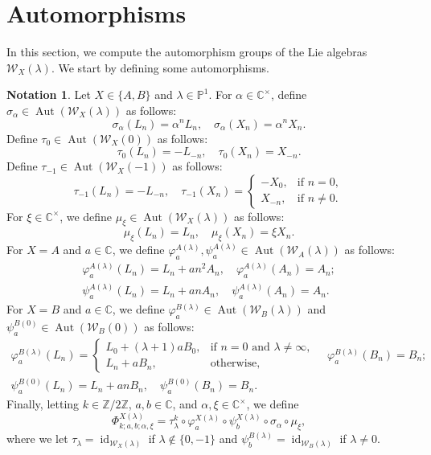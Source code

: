 \documentclass[11pt, svgnames]{amsart}
\newcommand{\ZZ}{\mathbb{Z}}
\newcommand{\CC}{\mathbb{C}}
\newcommand{\PP}{\mathbb{P}}
\newcommand{\W}{\mathcal{W}}
\DeclareMathOperator{\id}{id}
\DeclareMathOperator{\Aut}{Aut}
\theoremstyle{definition}
\newtheorem{Notation}[proposition]{Notation}
\begin{document}
\section{Automorphisms}\label{sec:automorphisms}

In this section, we compute the automorphism groups of the Lie algebras $\W_X(\lambda)$. We start by defining some automorphisms.

\begin{Notation}\label{ntt:automorphisms}
    Let $X \in \{A,B\}$ and $\lambda \in \PP^1$. For $\alpha \in \CC^\times$, define $\sigma_\alpha \in \Aut(\W_X(\lambda))$ as follows:
    $$\sigma_\alpha(L_n) = \alpha^n L_n, \quad \sigma_\alpha(X_n) = \alpha^n X_n.$$
    Define $\tau_0 \in \Aut(\W_X(0))$ as follows:
    $$\tau_0(L_n) = -L_{-n}, \quad \tau_0(X_n) = X_{-n}.$$
    Define $\tau_{-1} \in \Aut(\W_X(-1))$ as follows:
    $$\tau_{-1}(L_n) = -L_{-n}, \quad \tau_{-1}(X_n) = \begin{cases}
        -X_0, &\text{if } n = 0, \\
        X_{-n}, &\text{if } n \neq 0.
    \end{cases}$$
    For $\xi \in \CC^\times$, we define $\mu_\xi \in \Aut(\W_X(\lambda))$ as follows:
    $$\mu_\xi(L_n) = L_n, \quad \mu_\xi(X_n) = \xi X_n.$$
    For $X = A$ and $a \in \CC$, we define $\varphi^{A(\lambda)}_a, \psi^{A(\lambda)}_a \in \Aut(\W_A(\lambda))$ as follows:
    $$\begin{gathered}
        \varphi^{A(\lambda)}_a(L_n) = L_n + an^2 A_n, \quad \varphi^{A(\lambda)}_a(A_n) = A_n; \\
        \psi^{A(\lambda)}_a(L_n) = L_n + an A_n, \quad \psi^{A(\lambda)}_a(A_n) = A_n.
    \end{gathered}$$
    For $X = B$ and $a \in \CC$, we define $\varphi^{B(\lambda)}_a \in \Aut(\W_B(\lambda))$ and $\psi^{B(0)}_a \in \Aut(\W_B(0))$ as follows:
    $$\begin{gathered}
        \varphi^{B(\lambda)}_a(L_n) = \begin{cases}
            L_0 + (\lambda + 1)a B_0, &\text{if } n = 0 \text{ and } \lambda \neq \infty, \\
            L_n + a B_n, &\text{otherwise},
        \end{cases}
    \quad \varphi^{B(\lambda)}_a(B_n) = B_n; \\
    \psi^{B(0)}_a(L_n) = L_n + an B_n, \quad \psi^{B(0)}_a(B_n) = B_n.
    \end{gathered}$$
    Finally, letting $k \in \ZZ/2\ZZ$, $a,b \in \CC$, and $\alpha, \xi \in \CC^\times$, we define
    \begin{equation}\label{eq:outer automorphism general form}
        \Phi_{k;a,b;\alpha,\xi}^{X(\lambda)} = \tau_\lambda^k \circ \varphi_a^{X(\lambda)} \circ \psi_b^{X(\lambda)} \circ \sigma_\alpha \circ \mu_\xi,
    \end{equation}
    where we let $\tau_\lambda = \id_{\W_X(\lambda)}$ if $\lambda \notin \{0,-1\}$ and $\psi_b^{B(\lambda)} = \id_{\W_B(\lambda)}$ if $\lambda \neq 0$.
\end{Notation}
\end{document}
